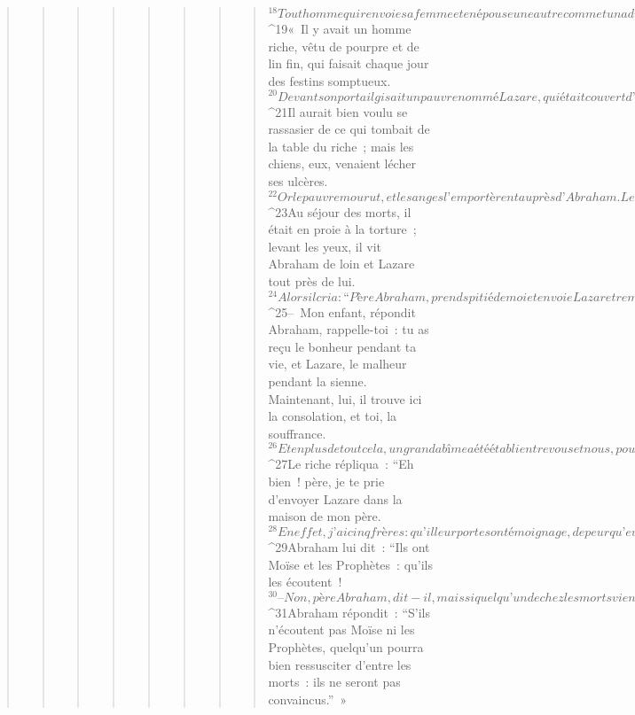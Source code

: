 \begin{verse}
\begin{verse}
\begin{verse}
\begin{verse}
\begin{verse}
\begin{verse}
\begin{verse}
\begin{verse}
${}^{18}Tout homme qui renvoie sa femme et en épouse une autre commet un adultère ; et celui qui épouse une femme renvoyée par son mari commet un adultère.
${}^{19}« Il y avait un homme riche, vêtu de pourpre et de lin fin, qui faisait chaque jour des festins somptueux. 
${}^{20}Devant son portail gisait un pauvre nommé Lazare, qui était couvert d’ulcères. 
${}^{21}Il aurait bien voulu se rassasier de ce qui tombait de la table du riche ; mais les chiens, eux, venaient lécher ses ulcères. 
${}^{22}Or le pauvre mourut, et les anges l’emportèrent auprès d’Abraham. Le riche mourut aussi, et on l’enterra. 
${}^{23}Au séjour des morts, il était en proie à la torture ; levant les yeux, il vit Abraham de loin et Lazare tout près de lui. 
${}^{24}Alors il cria : “Père Abraham, prends pitié de moi et envoie Lazare tremper le bout de son doigt dans l’eau pour me rafraîchir la langue, car je souffre terriblement dans cette fournaise. 
${}^{25}– Mon enfant, répondit Abraham, rappelle-toi : tu as reçu le bonheur pendant ta vie, et Lazare, le malheur pendant la sienne. Maintenant, lui, il trouve ici la consolation, et toi, la souffrance. 
${}^{26}Et en plus de tout cela, un grand abîme a été établi entre vous et nous, pour que ceux qui voudraient passer vers vous ne le puissent pas, et que, de là-bas non plus, on ne traverse pas vers nous.” 
${}^{27}Le riche répliqua : “Eh bien ! père, je te prie d’envoyer Lazare dans la maison de mon père. 
${}^{28}En effet, j’ai cinq frères : qu’il leur porte son témoignage, de peur qu’eux aussi ne viennent dans ce lieu de torture !” 
${}^{29}Abraham lui dit : “Ils ont Moïse et les Prophètes : qu’ils les écoutent ! 
${}^{30}– Non, père Abraham, dit-il, mais si quelqu’un de chez les morts vient les trouver, ils se convertiront.” 
${}^{31}Abraham répondit : “S’ils n’écoutent pas Moïse ni les Prophètes, quelqu’un pourra bien ressusciter d’entre les morts : ils ne seront pas convaincus.” »
      

\end{verse}
\end{verse}
\end{verse}
\end{verse}
\end{verse}
\end{verse}
\end{verse}
\end{verse}
